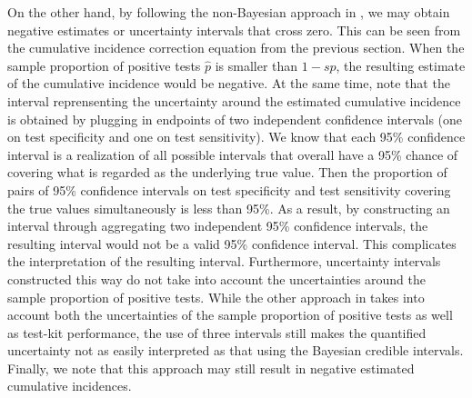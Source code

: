 On the other hand, by following the non-Bayesian approach in \cite{meyer2022adjusting}, we may obtain negative estimates or uncertainty intervals that cross zero. This can be seen from the cumulative incidence correction equation from the previous section. When the sample proportion of positive tests $\hat{p}$ is smaller than $1-sp$, the resulting estimate of the cumulative incidence would be negative. At the same time, note that the interval reprensenting the uncertainty around the estimated cumulative incidence is obtained by plugging in endpoints of two independent confidence intervals (one on test specificity and one on test sensitivity). We know that each 95\% confidence interval is a realization of all possible intervals that overall have a 95\% chance of covering what is regarded as the underlying true value. Then the proportion of pairs of 95\% confidence intervals on test specificity and test sensitivity covering the true values simultaneously is less than 95\%. As a result, by constructing an interval through aggregating two independent 95\% confidence intervals, the resulting interval would not be a valid 95\% confidence interval. This complicates the interpretation of the resulting interval. Furthermore, uncertainty intervals constructed this way do not take into account the uncertainties around the sample proportion of positive tests. While the other approach in \cite{rosenberg2020cumulative} takes into account both the uncertainties of the sample proportion of positive tests as well as test-kit performance, the use of three intervals still makes the quantified uncertainty not as easily interpreted as that using the Bayesian credible intervals. Finally, we note that this approach may still result in negative estimated cumulative incidences.

